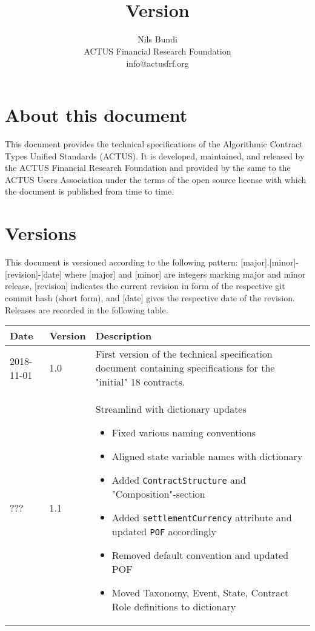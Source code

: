 \documentclass[9pt,oneside]{amsart}
\title{\doctitle \\
      {\smaller \textbf{Version \VersionNumber}}}
\author{
	Nils Bundi\\
	ACTUS Financial Research Foundation\\
	info@actusfrf.org
}
\newcommand{\attr}[1]{\texttt{#1}}
\begin{document}
%

\maketitle


\section*{About this document}\label{sec:about}

This document provides the technical specifications of the Algorithmic Contract Types Unified Standards (ACTUS). It is developed, maintained, and released by the ACTUS Financial Research Foundation and provided by the same to the ACTUS Users Association under the terms of the open source license with which the document is published from time to time.


\section*{Versions}\label{sec:version}

This document is versioned according to the following pattern: [major].[minor]-[revision]-[date] where [major] and [minor] are integers marking major and minor release, [revision] indicates the current revision in form of the respective git commit hash (short form), and [date] gives the respective date of the revision. Releases are recorded in the following table.

\begin{table}[H]
  \centering
  \begin{tabular}{| p{} | p{} | p{} |}
  \hline
  Date & Version & Description \\
  \hline
  2018-11-01 & 1.0 & First version of the technical specification document containing specifications for the "initial" 18 contracts.\\
  \hline
  ??? & 1.1 & Streamlind with dictionary updates
	\begin{itemize}
		\item Fixed various naming conventions
		\item Aligned state variable names with dictionary
		\item Added \attr{ContractStructure} and "Composition"-section
		\item Added \attr{settlementCurrency} attribute and updated \attr{POF} accordingly
		\item Removed default convention and updated POF
		\item Moved Taxonomy, Event, State, Contract Role definitions to dictionary
	\end{itemize} \\
  \hline
  \end{tabular}
\end{table}
\end{document}
